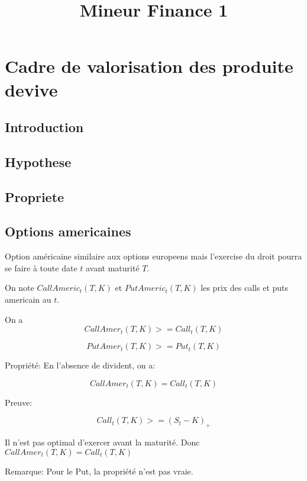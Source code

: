 \documentclass{article}
\title{Mineur Finance 1}
\begin{document}
\maketitle

\tableofcontents
\pagebreak

\section{Cadre de valorisation des produite devive}
\subsection{Introduction}
\subsection{Hypothese}
\subsection{Propriete}
\subsection{Options americaines}
Option am\'ericaine similaire aux options europeens mais l'exercise du droit pourra se faire \`a toute date $t$ avant maturit\'e $T$.

On note $CallAmeric_t(T, K)$ et $PutAmeric_t(T, K)$ les prix des calls et puts americain au $t$.

On a 
\begin{equation}
CallAmer_t(T,K) >= Call_t(T, K)
\end{equation}

\begin{equation}
PutAmer_t(T, K) >= Put_t(T, K)
\end{equation}

Propri\'et\'e:
En l'absence de divident, on a:

\begin{equation}
CallAmer_t(T, K) = Call_t(T, K)
\end{equation}

Preuve:

\begin{equation}
Call_t(T, K) >= (S_t- K)_+
\end{equation}

Il n'est pas optimal d'exercer avant la maturit\'e. Donc $CallAmer_t(T, K) = Call_t(T, K)$

Remarque: Pour le Put, la propri\'et\'e n'est pas vraie.
\end{document}
